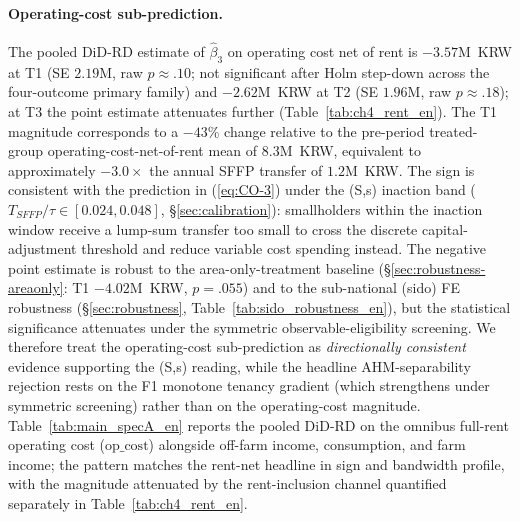 \documentclass[12pt, a4paper]{article}
\begin{document}
\paragraph{Operating-cost sub-prediction.} The pooled DiD-RD estimate of $\hat\beta_3$ on operating cost net of rent is $-3.57$M~KRW at T1 (SE $2.19$M, raw $p \approx .10$; not significant after Holm step-down across the four-outcome primary family) and $-2.62$M~KRW at T2 (SE $1.96$M, raw $p \approx .18$); at T3 the point estimate attenuates further (Table~\ref{tab:ch4_rent_en}). The T1 magnitude corresponds to a $-43\%$ change relative to the pre-period treated-group operating-cost-net-of-rent mean of $8.3$M~KRW, equivalent to approximately $-3.0 \times$ the annual SFFP transfer of $1.2$M~KRW. The sign is consistent with the prediction in (\ref{eq:CO-3}) under the (S,s) inaction band ($T_{SFFP}/\tau \in [0.024, 0.048]$, \S\ref{sec:calibration}): smallholders within the inaction window receive a lump-sum transfer too small to cross the discrete capital-adjustment threshold and reduce variable cost spending instead. The negative point estimate is robust to the area-only-treatment baseline (\S\ref{sec:robustness-areaonly}: T1 $-4.02$M~KRW, $p = .055$) and to the sub-national (sido) FE robustness (\S\ref{sec:robustness}, Table~\ref{tab:sido_robustness_en}), but the statistical significance attenuates under the symmetric observable-eligibility screening. We therefore treat the operating-cost sub-prediction as \emph{directionally consistent} evidence supporting the (S,s) reading, while the headline AHM-separability rejection rests on the F1 monotone tenancy gradient (which strengthens under symmetric screening) rather than on the operating-cost magnitude. Table~\ref{tab:main_specA_en} reports the pooled DiD-RD on the omnibus full-rent operating cost ($\text{op\_cost}$) alongside off-farm income, consumption, and farm income; the pattern matches the rent-net headline in sign and bandwidth profile, with the magnitude attenuated by the rent-inclusion channel quantified separately in Table~\ref{tab:ch4_rent_en}.


\end{document}
